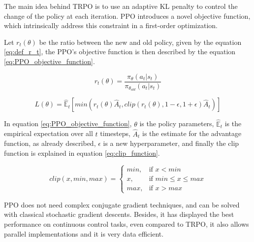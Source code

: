 The main idea behind TRPO is to use an adaptive KL penalty to control the change of the policy at each iteration. PPO introduces a novel objective function, which intrinsically address this constraint in a first-order optimization.

Let $r_t(\theta)$ be the ratio between the new and old policy, given by the equation \ref{eq:def_r_t}, the PPO's objective function is then described by the equation \ref{eq:PPO_objective_function}.

\begin{equation}
r_t(\theta) = \frac{\pi_{\theta}(a_t|s_t)}{\pi_{\theta_{old}}(a_t|s_t)}
\label{eq:def_r_t}
\end{equation}

\begin{equation}
L(\theta) = \mathbb{\hat{E}}_t \left[ min(r_t(\theta)\hat{A}_t, clip(r_t(\theta),1-\epsilon,1+\epsilon)\hat{A}_t) \right]
\label{eq:PPO_objective_function}
\end{equation}

In equation \ref{eq:PPO_objective_function}, $\theta$ is the policy parameters, $\mathbb{\hat{E}}_t$ is the empirical expectation over all $t$ timesteps, $\hat{A}_t$ is the estimate for the advantage function, as already described, $\epsilon$ is a new hyperparameter, and finally the clip function is explained in equation \ref{eq:clip_function}.

\begin{equation}
clip(x,min,max) = \begin{cases}
        min, & \mbox{if } x < min \\
        x, & \mbox{if } min \leq x \leq max \\
        max, & \mbox{if } x > max
        \end{cases}
\label{eq:clip_function}
\end{equation}

PPO does not need complex conjugate gradient techniques, and can be solved with classical stochastic gradient descents. Besides, it has displayed the best performance on continuous control tasks, even compared to TRPO, it also allows parallel implementations and it is very data efficient.


